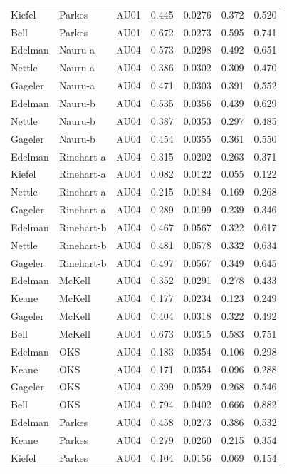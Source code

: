 \documentclass{monashthesis}
\begin{document}
\begin{center}
\begin{longtable}{lllllll}
Kiefel & Parkes & AU01 & 0.445 & 0.0276 & 0.372 & 0.520 \\
Bell & Parkes & AU01 & 0.672 & 0.0273 & 0.595 & 0.741 \\
Edelman & Nauru-a & AU04 & 0.573 & 0.0298 & 0.492 & 0.651 \\
Nettle & Nauru-a & AU04 & 0.386 & 0.0302 & 0.309 & 0.470 \\
Gageler & Nauru-a & AU04 & 0.471 & 0.0303 & 0.391 & 0.552 \\
Edelman & Nauru-b & AU04 & 0.535 & 0.0356 & 0.439 & 0.629 \\
Nettle & Nauru-b & AU04 & 0.387 & 0.0353 & 0.297 & 0.485 \\
Gageler & Nauru-b & AU04 & 0.454 & 0.0355 & 0.361 & 0.550 \\
Edelman & Rinehart-a & AU04 & 0.315 & 0.0202 & 0.263 & 0.371 \\
Kiefel & Rinehart-a & AU04 & 0.082 & 0.0122 & 0.055 & 0.122 \\
Nettle & Rinehart-a & AU04 & 0.215 & 0.0184 & 0.169 & 0.268 \\
Gageler & Rinehart-a & AU04 & 0.289 & 0.0199 & 0.239 & 0.346 \\
Edelman & Rinehart-b & AU04 & 0.467 & 0.0567 & 0.322 & 0.617 \\
Nettle & Rinehart-b & AU04 & 0.481 & 0.0578 & 0.332 & 0.634 \\
Gageler & Rinehart-b & AU04 & 0.497 & 0.0567 & 0.349 & 0.645 \\
Edelman & McKell & AU04 & 0.352 & 0.0291 & 0.278 & 0.433 \\
Keane & McKell & AU04 & 0.177 & 0.0234 & 0.123 & 0.249 \\
Gageler & McKell & AU04 & 0.404 & 0.0318 & 0.322 & 0.492 \\
Bell & McKell & AU04 & 0.673 & 0.0315 & 0.583 & 0.751 \\
Edelman & OKS & AU04 & 0.183 & 0.0354 & 0.106 & 0.298 \\
Keane & OKS & AU04 & 0.171 & 0.0354 & 0.096 & 0.288 \\
Gageler & OKS & AU04 & 0.399 & 0.0529 & 0.268 & 0.546 \\
Bell & OKS & AU04 & 0.794 & 0.0402 & 0.666 & 0.882 \\
Edelman & Parkes & AU04 & 0.458 & 0.0273 & 0.386 & 0.532 \\
Keane & Parkes & AU04 & 0.279 & 0.0260 & 0.215 & 0.354 \\
Kiefel & Parkes & AU04 & 0.104 & 0.0156 & 0.069 & 0.154 \\

\end{longtable}
\end{center}
\end{document}
